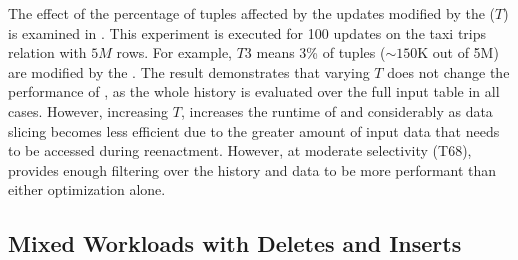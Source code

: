 \label{sec:exp-ds}
The effect of the percentage of  tuples affected by the updates modified by the \abbrHW ($T$) is examined in . This experiment is executed for 100 updates on the taxi trips relation with $5M$ rows. For example, $T3$ means 3\% of tuples ($\sim150$K out of 5M) are modified by the \abbrHW. The result demonstrates that varying $T$ does not change the performance of \mrp, as the whole history is evaluated over the full input table in all cases. However, increasing $T$, increases the runtime of \mrd and \mrdp considerably as data slicing becomes less efficient due to the greater amount of input data that needs to be accessed during reenactment. However, at moderate selectivity (T68), \mrdp provides enough filtering over the history and data to be more performant than either optimization alone. %
%
%

%
%
%

%
%
%
%
%

%
%
%
%
%
%
%


\subsection{Mixed Workloads with Deletes and Inserts}\label{sec:mixed-workl-updat}

